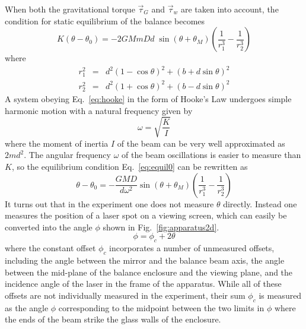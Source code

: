 \documentclass{revtex4}
\begin{document}
When both the gravitational torque $\vec{\tau}_G$ and $\vec{\tau}_w$ are
taken into account, the condition for static equilibrium of the balance
becomes
\begin{equation}
K(\theta-\theta_0)=-2GMmDd\;\sin(\theta+\theta_M)
\left(\frac{1}{r_1^3}-\frac{1}{r_2^3}\right)
\label{eq:equil0}
\end{equation}
where
\begin{eqnarray}
r_1^2 &=& d^2(1-\cos\theta)^2 + (b+d\sin\theta)^2
\nonumber\\
r_2^2 &=& d^2(1+\cos\theta)^2 + (b-d\sin\theta)^2
\label{eq:r12}
\end{eqnarray}
A system obeying Eq.~\ref{eq:hooke} in the form of Hooke's Law undergoes
simple harmonic motion with a natural frequency given by
\begin{equation}
\omega=\sqrt{\frac{K}{I}}
\end{equation}
where the moment of inertia $I$ of the beam can be very well approximated
as $2md^2$.  The angular frequency $\omega$ of the beam oscillations is
easier to measure than $K$, so the equilibrium condition Eq.~\ref{eq:equil0}
can be rewritten as
\begin{equation}
\theta-\theta_0=-\frac{GMD}{d\omega^2}\sin(\theta+\theta_M)
\left(\frac{1}{r_1^3}-\frac{1}{r_2^3}\right)
\label{eq:equil1}
\end{equation}
It turns out that in the experiment one does not measure $\theta$ directly.
Instead one measures the position of a laser spot on a viewing screen, which
can easily be converted into the angle $\phi$ shown in
Fig.~\ref{fig:apparatus2d}.
\begin{equation}
\phi=\phi_c+2\theta
\end{equation}
where the constant offset $\phi_c$ incorporates a number of unmeasured
offsets, including the angle between the mirror and the balance beam axis,
the angle between the mid-plane of the balance enclosure and the viewing
plane, and the incidence angle of the laser in the frame of the apparatus.
While all of these offsets are not individually measured in the experiment,
their sum $\phi_c$ is measured as the angle $\phi$ corresponding to the
midpoint between the two limits in $\phi$ where the ends of the beam strike
the glass walls of the enclosure.
\end{document}
